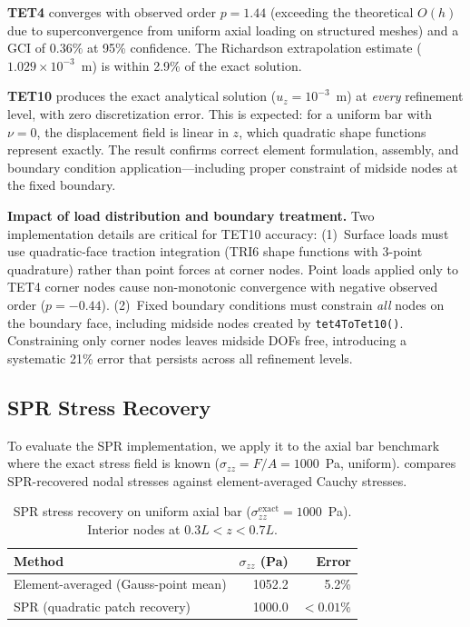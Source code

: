 \documentclass[journal]{IEEEtran}
\begin{document}
\textbf{TET4} converges with observed order $p = 1.44$
(exceeding the theoretical $O(h)$ due to superconvergence from uniform
axial loading on structured meshes) and a GCI of $0.36\%$ at 95\%
confidence. The Richardson extrapolation estimate ($1.029 \times 10^{-3}$~m)
is within 2.9\% of the exact solution.

\textbf{TET10} produces the exact analytical solution ($u_z = 10^{-3}$~m)
at \emph{every} refinement level, with zero discretization error. This is
expected: for a uniform bar with $\nu = 0$, the displacement field is linear
in $z$, which quadratic shape functions represent exactly. The result
confirms correct element formulation, assembly, and boundary condition
application---including proper constraint of midside nodes at the fixed
boundary.

\textbf{Impact of load distribution and boundary treatment.} Two
implementation details are critical for TET10 accuracy:
(1)~Surface loads must use quadratic-face traction integration (TRI6 shape
functions with 3-point quadrature) rather than point forces at corner nodes.
Point loads applied only to TET4 corner nodes cause non-monotonic
convergence with negative observed order ($p = -0.44$).
(2)~Fixed boundary conditions must constrain \emph{all} nodes on the
boundary face, including midside nodes created by \texttt{tet4ToTet10()}.
Constraining only corner nodes leaves midside DOFs free, introducing
a systematic 21\% error that persists across all refinement levels.

\subsection{SPR Stress Recovery}

To evaluate the SPR implementation, we apply it to the axial bar benchmark
where the exact stress field is known ($\sigma_{zz} = F/A = 1000$~Pa,
uniform).  compares SPR-recovered nodal stresses against
element-averaged Cauchy stresses.

\begin{table}[t]
  \centering
  \caption{SPR stress recovery on uniform axial bar ($\sigma_{zz}^{\text{exact}} = 1000$~Pa).
    Interior nodes at $0.3L < z < 0.7L$.}
  \label{tab:spr}
  \begin{tabular}{@{}lrr@{}}
    \toprule
    Method & $\sigma_{zz}$ (Pa) & Error \\
    \midrule
    Element-averaged (Gauss-point mean) & 1052.2 & 5.2\% \\
    SPR (quadratic patch recovery)      & 1000.0 & $< 0.01\%$ \\
    \bottomrule
  \end{tabular}
\end{table}
\end{document}
